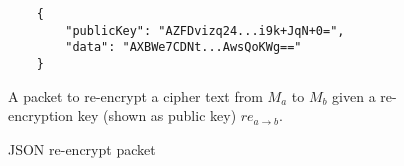 \begin{figure}[H]
  \centering
  \begin{verbatim}
	{
		"publicKey": "AZFDvizq24...i9k+JqN+0=",
		"data": "AXBWe7CDNt...AwsQoKWg=="
	}
  \end{verbatim}
  \caption{
  	JSON re-encrypt packet
  }{
  	A packet to re-encrypt a cipher text from $M_a$ to $M_b$ given a re-encryption key (shown as public key) $re_{a \rightarrow b}$.
  }
  \label{code:reencrypt_data_json}
\end{figure}
